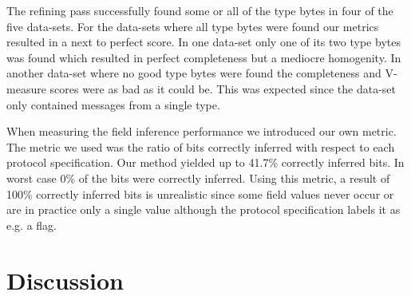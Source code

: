 \documentclass[a4paper,twocolumn]{article}
\begin{document}
The refining pass successfully found some or all of the type bytes
in four of the five data-sets. For the data-sets where all type bytes
were found our metrics resulted in a next to perfect score. In one data-set
only one of its two type bytes was found which resulted in perfect
completeness but a mediocre homogenity. In another data-set where no good
type bytes were found the completeness and V-measure scores were as bad as
it could be. This was expected since the data-set only contained messages
from a single type.

When measuring the field inference performance we introduced our own metric.
The metric we used was the ratio of bits correctly inferred with respect to
each protocol specification. Our method yielded up to 41.7\% correctly
inferred bits. In worst case 0\% of the bits were correctly inferred.
Using this metric, a result of 100\% correctly inferred bits is unrealistic
since some field values never occur or are in practice only a single value
although the protocol specification labels it as e.g. a flag.

\section{Discussion}
\end{document}
